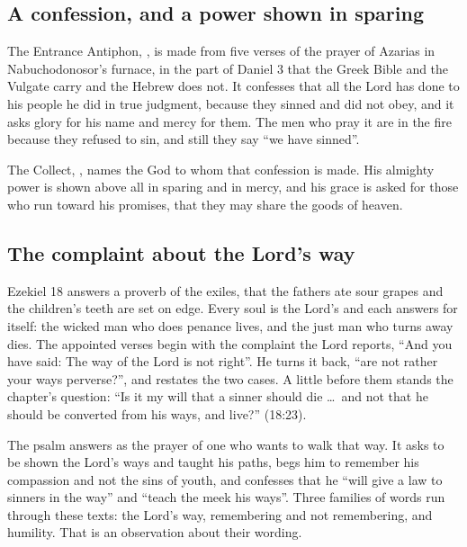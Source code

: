 \subsection{A confession, and a power shown in sparing}

The Entrance Antiphon, , is made from
five verses of the prayer of Azarias in Nabuchodonosor's furnace, in the part
of Daniel 3 that the Greek Bible and the Vulgate carry and the Hebrew does not.
It confesses that all the Lord has done to his people he did in true judgment,
because they sinned and did not obey, and it asks glory for his name and mercy
for them. The men who pray it are in the fire because they refused to sin, and
still they say ``we have sinned''.

The Collect, , names the God to whom that
confession is made. His almighty power is shown above all in sparing and in
mercy, and his grace is asked for those who run toward his promises, that they
may share the goods of heaven.

\subsection{The complaint about the Lord's way}

Ezekiel 18 answers a proverb of the exiles, that the fathers ate sour grapes
and the children's teeth are set on edge. Every soul is the Lord's and each
answers for itself: the wicked man who does penance lives, and the just man who
turns away dies. The appointed verses begin with the complaint the Lord
reports, ``And you have said: The way of the Lord is not right''. He turns it
back, ``are not rather your ways perverse?'', and restates the two cases. A
little before them stands the chapter's question: ``Is it my will that a sinner should
die \ldots\ and not that he should be converted from his ways, and live?''
(18:23).

The psalm answers as the prayer of one who wants to walk that way. It asks to
be shown the Lord's ways and taught his paths, begs him to remember his
compassion and not the sins of youth, and confesses that he ``will give a law
to sinners in the way'' and ``teach the meek his ways''. Three families of
words run through these texts: the Lord's way, remembering and not
remembering, and humility. That is an observation about their wording.

\pagebreak
